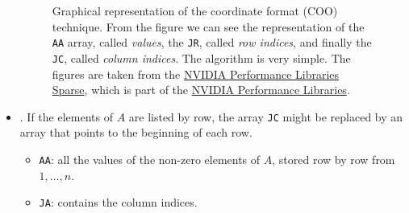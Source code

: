\begin{itemize}
\begin{figure}[!htp]
		\caption{Graphical representation of the coordinate format (COO) technique. From the figure we can see the representation of the \texttt{AA} array, called \emph{values}, the \texttt{JR}, called \emph{row indices}, and finally the \texttt{JC}, called \emph{column indices}. The algorithm is very simple. The figures are taken from the \href{https://docs.nvidia.com/nvpl/_static/sparse/storage_format/sparse_matrix.html}{NVIDIA Performance Libraries Sparse}, which is part of the \href{https://developer.nvidia.com/nvpl}{NVIDIA Performance Libraries}.}
	\end{figure}
	
	\item {}. If the elements of $A$ are listed by row, the array \texttt{JC} might be replaced by an array that points to the beginning of each row.
	\begin{itemize}
		\item \texttt{AA}: all the values of the non-zero elements of $A$, stored row by row from $1, \dots, n$.
		
		\item \texttt{JA}: contains the column indices.
		

\end{itemize}
\end{itemize}
